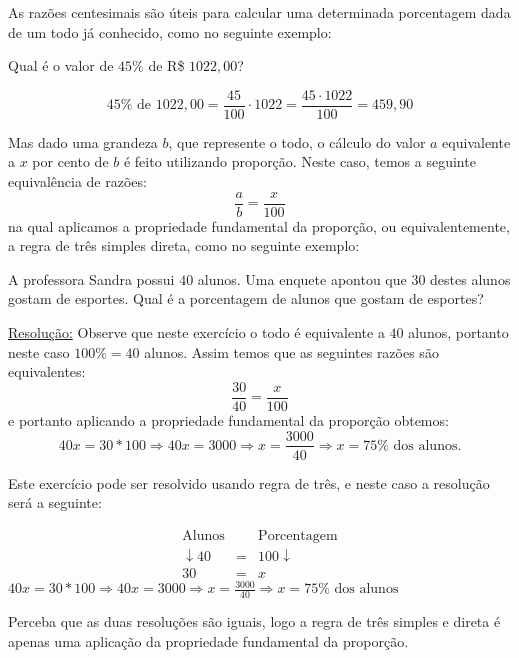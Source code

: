 As razões centesimais são úteis para calcular uma determinada porcentagem dada de um todo já conhecido, como no seguinte exemplo:
\begin{exem}
 Qual é o valor de $45 \%$ de R\$ $1022,00$?

\begin{equation}
45 \% \text{ de } 1022,00= \frac{45}{100} \cdot 1022= \frac{45\cdot 1022}{100}= 459,90
\end{equation}
\fim
\end{exem}


Mas dado uma grandeza $b$, que represente o todo, o cálculo do valor $a$ equivalente a $x$ por cento de $b$ é feito utilizando proporção. Neste caso, temos a seguinte equivalência de razões:
\begin{equation}
\frac{a}{b}= \frac{x}{100}
\end{equation}
na qual aplicamos a propriedade fundamental da proporção, ou equivalentemente, a regra de três simples direta, como no seguinte exemplo:


\begin{exem}
 A professora Sandra possui $40$ alunos. Uma enquete apontou que $30$ destes alunos gostam de esportes. Qual é a porcentagem de alunos que gostam de esportes?

 \underline{Resolução:}
 Observe que neste exercício o todo é equivalente a $40$ alunos, portanto neste caso $100 \%= 40$ alunos. Assim temos que as seguintes razões são equivalentes:
\begin{equation}
\frac{30}{40}= \frac{x}{100}
\end{equation}
  e portanto aplicando a propriedade fundamental da proporção obtemos:
\begin{equation}
40 x = 30*100 \Rightarrow 40 x = 3000 \Rightarrow x = \frac{3000}{40} \Rightarrow x=  75 \% \text{ dos alunos}.
\end{equation}

 Este exercício pode ser resolvido usando regra de três, e neste caso a resolução será a seguinte:

  \begin{eqnarray*}
  \text{Alunos} & & \text{Porcentagem} \\
  \downarrow 40 & = & 100 \downarrow \\
  30 & = & x
 \end{eqnarray*}
 $40 x = 30*100 \Rightarrow 40 x = 3000 \Rightarrow x = \frac{3000}{40} \Rightarrow x=  75 \% \text{ dos alunos}$

 Perceba que as duas resoluções são iguais, logo a regra de três simples e direta é apenas uma aplicação da propriedade fundamental da proporção.
 \fim

\end{exem}

